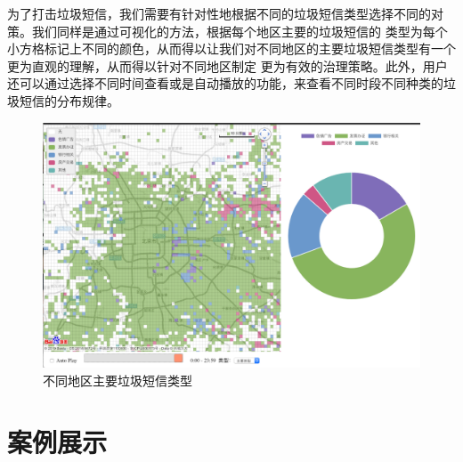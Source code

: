 \documentclass[12pt,a4paper]{article}
\begin{document}
为了打击垃圾短信，我们需要有针对性地根据不同的垃圾短信类型选择不同的对策。我们同样是通过可视化的方法，根据每个地区主要的垃圾短信的
类型为每个小方格标记上不同的颜色，从而得以让我们对不同地区的主要垃圾短信类型有一个更为直观的理解，从而得以针对不同地区制定
更为有效的治理策略。此外，用户还可以通过选择不同时间查看或是自动播放的功能，来查看不同时段不同种类的垃圾短信的分布规律。

\begin{flushleft}
	\begin{figure}[H]
		\centering
			\includegraphics[width=\linewidth]{pic2.png}
			\caption{不同地区主要垃圾短信类型}
	\end{figure}
\end{flushleft}

\section{案例展示}
\end{document}

